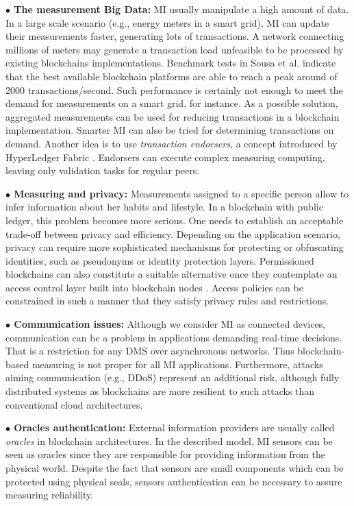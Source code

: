 \documentclass[journal]{IEEEtran}
\begin{document}
\textbf{$\bullet$ The measurement Big Data:} MI usually manipulate a high amount of data. In a large scale scenario (e.g., energy meters in a smart grid), MI can update their measurements faster, generating lots of transactions. A network connecting millions of meters may generate a transaction load unfeasible to be processed by existing blockchains implementations. Benchmark tests in Sousa et al. \cite{Sousa2018} indicate that the best available blockchain platforms are able to reach a peak around of 2000 transactions/second. Such performance is certainly not enough to meet the demand for measurements on a smart grid, for instance. As a possible solution, aggregated measurements can be used for reducing transactions in a blockchain implementation. Smarter MI can also be tried for determining transactions on demand. Another idea is to use \emph{transaction endorsers}, a concept introduced by HyperLedger Fabric \cite{Sousa2018}. Endorsers can execute complex measuring computing, leaving only validation tasks for regular peers.

\textbf{$\bullet$ Measuring and privacy:} Measurements assigned to a specific person allow to infer information about her habits and lifestyle. In a blockchain with public ledger, this problem becomes more serious. One needs to establish an acceptable trade-off between privacy and efficiency. Depending on the application scenario, privacy can require more sophisticated mechanisms for protecting or obfuscating identities, such as pseudonyms or identity protection layers. Permissioned blockchains can also constitute a suitable alternative once they contemplate an access control layer built into blockchain nodes \cite{Vukolic2016}. Access policies can be constrained in such a manner that they satisfy privacy rules and restrictions.

\textbf{$\bullet$ Communication issues:} Although we consider MI as connected devices, communication can be a problem in applications demanding real-time decisions. That is a restriction for any DMS over asynchronous networks. Thus blockchain-based measuring is not proper for all MI applications. Furthermore, attacks aiming communication (e.g., DDoS) represent an additional risk, although fully distributed systems as blockchains are more resilient to such attacks than conventional cloud architectures.

\textbf{$\bullet$ Oracles authentication:} External information providers are usually called \emph{oracles} in blockchain architectures. In the described model, MI sensors can be seen as oracles since they are responsible for providing information from the physical world. Despite the fact that sensors are small components which can be protected using physical seals, sensors authentication can be necessary to assure measuring reliability.
\end{document}

